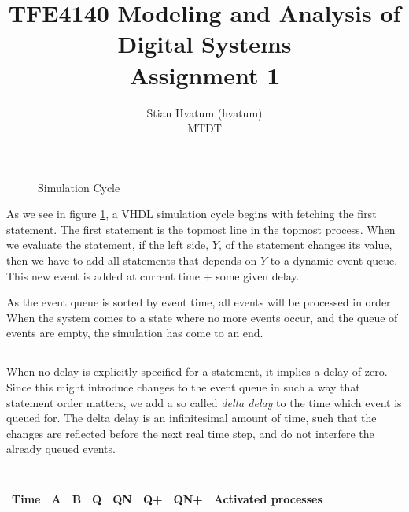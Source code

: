 \documentclass[english,a4paper]{report}
\title{TFE4140 Modeling and Analysis of Digital Systems\\
\Huge Assignment 1}
\author{Stian Hvatum (hvatum)\\MTDT}
\begin{document}
\maketitle
\tableofcontents
\newpage
\section{}
\subsection{}
\subsection{}
\begin{figure}

\caption{Simulation Cycle}
\label{dia:simcycle}
\end{figure}
As we see in figure \ref{dia:simcycle}, a VHDL simulation cycle begins with fetching the first statement.
The first statement is the topmost line in the topmost process.
When we evaluate the statement, if the left side, $Y$, of the statement changes its value, then we have to add
all statements that depends on $Y$ to a dynamic event queue. This new event is added at current time + some given delay.

As the event queue is sorted by event time, all events will be processed in order. When the system comes to a state where no more
events occur, and the queue of events are empty, the simulation has come to an end.

\subsection{}
When no delay is explicitly specified for a statement, it implies a delay of zero. Since this might introduce changes to the
event queue in such a way that statement order matters, we add a so called \textit{delta delay} to the time which event is queued for.
The delta delay is an infinitesimal amount of time, such that the changes are reflected before the next real time step,
and do not interfere the already queued events.

\section{}
\subsection{}
\begin{tabular}{|c|c|c|c|c|c|c|c|}
    \hline
    Time	&A	&B	&Q	&QN	&Q+	&QN+	&Activated processes\\
    \hline
    
    \hline
\end{tabular}
\end{document}
